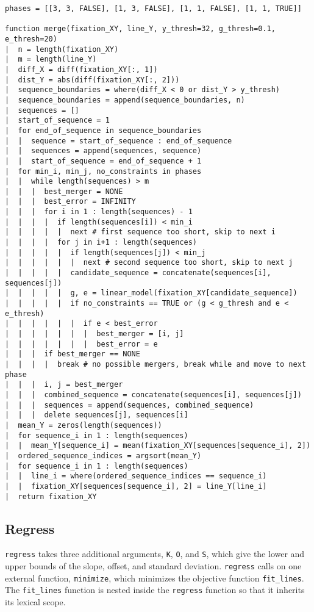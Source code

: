 \documentclass[doc,biblatex]{apa7}
\begin{document}
\begin{verbatim}
phases = [[3, 3, FALSE], [1, 3, FALSE], [1, 1, FALSE], [1, 1, TRUE]]

function merge(fixation_XY, line_Y, y_thresh=32, g_thresh=0.1, e_thresh=20)
|  n = length(fixation_XY)
|  m = length(line_Y)
|  diff_X = diff(fixation_XY[:, 1])
|  dist_Y = abs(diff(fixation_XY[:, 2]))
|  sequence_boundaries = where(diff_X < 0 or dist_Y > y_thresh)
|  sequence_boundaries = append(sequence_boundaries, n)
|  sequences = []
|  start_of_sequence = 1
|  for end_of_sequence in sequence_boundaries
|  |  sequence = start_of_sequence : end_of_sequence
|  |  sequences = append(sequences, sequence)
|  |  start_of_sequence = end_of_sequence + 1
|  for min_i, min_j, no_constraints in phases
|  |  while length(sequences) > m
|  |  |  best_merger = NONE
|  |  |  best_error = INFINITY
|  |  |  for i in 1 : length(sequences) - 1
|  |  |  |  if length(sequences[i]) < min_i
|  |  |  |  |  next # first sequence too short, skip to next i
|  |  |  |  for j in i+1 : length(sequences)
|  |  |  |  |  if length(sequences[j]) < min_j
|  |  |  |  |  |  next # second sequence too short, skip to next j
|  |  |  |  |  candidate_sequence = concatenate(sequences[i], sequences[j])
|  |  |  |  |  g, e = linear_model(fixation_XY[candidate_sequence])
|  |  |  |  |  if no_constraints == TRUE or (g < g_thresh and e < e_thresh)
|  |  |  |  |  |  if e < best_error
|  |  |  |  |  |  |  best_merger = [i, j]
|  |  |  |  |  |  |  best_error = e
|  |  |  if best_merger == NONE
|  |  |  |  break # no possible mergers, break while and move to next phase
|  |  |  i, j = best_merger
|  |  |  combined_sequence = concatenate(sequences[i], sequences[j])
|  |  |  sequences = append(sequences, combined_sequence)
|  |  |  delete sequences[j], sequences[i]
|  mean_Y = zeros(length(sequences))
|  for sequence_i in 1 : length(sequences)
|  |  mean_Y[sequence_i] = mean(fixation_XY[sequences[sequence_i], 2])
|  ordered_sequence_indices = argsort(mean_Y)
|  for sequence_i in 1 : length(sequences)
|  |  line_i = where(ordered_sequence_indices == sequence_i)
|  |  fixation_XY[sequences[sequence_i], 2] = line_Y[line_i]
|  return fixation_XY
\end{verbatim}

\subsection{Regress}

\noindent
\texttt{regress} takes three additional arguments, \texttt{K}, \texttt{O}, and \texttt{S}, which give the lower and upper bounds of the slope, offset, and standard deviation. \texttt{regress} calls on one external function, \texttt{minimize}, which minimizes the objective function \texttt{fit\_lines}. The \texttt{fit\_lines} function is nested inside the \texttt{regress} function so that it inherits its lexical scope.
\end{document}
